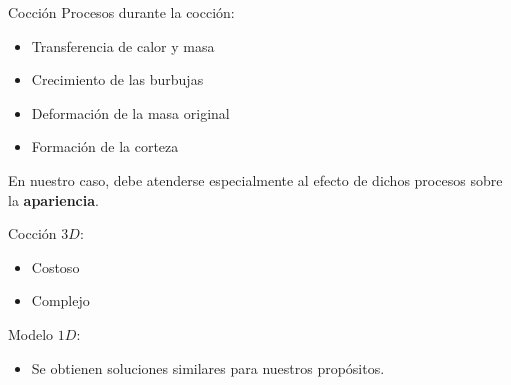 \documentclass[spanish,unknownkeysallowed]{beamer}
\begin{document}
\begin{frame}{Cocción}
Procesos durante la cocción:

\begin{itemize}
\item Transferencia de calor y masa
\item Crecimiento de las burbujas
\item Deformación de la masa original
\item Formación de la corteza
\end{itemize}

En nuestro caso, debe atenderse especialmente al efecto de dichos procesos sobre la \textbf{apariencia}.



Cocción $3D$:

\begin{itemize}
\item Costoso
\item Complejo
\end{itemize}


Modelo $1D$:

\begin{itemize}
\item Se obtienen soluciones similares para nuestros propósitos.
\end{itemize}


%



\end{frame}
\end{document}
